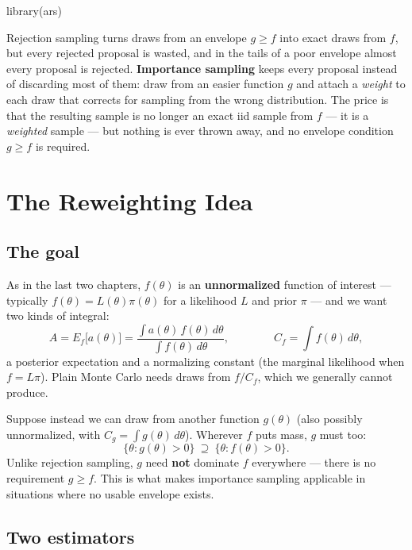 \documentclass[
  letterpaper,
  DIV=11,
  numbers=noendperiod]{scrreprt}
\newenvironment{Shaded}{\begin{snugshade}}{\end{snugshade}}
\newcommand{\FunctionTok}[1]{\textcolor[rgb]{0.28,0.35,0.67}{#1}}
\newcommand{\NormalTok}[1]{\textcolor[rgb]{0.00,0.23,0.31}{#1}}
\begin{document}
\begin{Shaded}
\begin{Highlighting}[]
\FunctionTok{library}\NormalTok{(ars)}
\end{Highlighting}
\end{Shaded}

Rejection sampling turns draws from an envelope \(g \ge f\) into exact
draws from \(f\), but every rejected proposal is wasted, and in the
tails of a poor envelope almost every proposal is rejected.
\textbf{Importance sampling} keeps every proposal instead of discarding
most of them: draw from an easier function \(g\) and attach a
\emph{weight} to each draw that corrects for sampling from the wrong
distribution. The price is that the resulting sample is no longer an
exact iid sample from \(f\) --- it is a \emph{weighted} sample --- but
nothing is ever thrown away, and no envelope condition \(g \ge f\) is
required.

\section{The Reweighting Idea}\label{the-reweighting-idea}

\subsection{The goal}\label{the-goal}

As in the last two chapters, \(f(\theta)\) is an \textbf{unnormalized}
function of interest --- typically \(f(\theta) = L(\theta)\pi(\theta)\)
for a likelihood \(L\) and prior \(\pi\) --- and we want two kinds of
integral: \[
A = E_f\big[a(\theta)\big] = \frac{\int a(\theta)\,f(\theta)\,d\theta}{\int f(\theta)\,d\theta},
\qquad\qquad
C_f = \int f(\theta)\,d\theta,
\] a posterior expectation and a normalizing constant (the marginal
likelihood when \(f = L\pi\)). Plain Monte Carlo needs draws from
\(f/C_f\), which we generally cannot produce.

Suppose instead we can draw from another function \(g(\theta)\) (also
possibly unnormalized, with \(C_g = \int g(\theta)\,d\theta\)). Wherever
\(f\) puts mass, \(g\) must too: \[
\{\theta : g(\theta) > 0\} \ \supseteq\ \{\theta : f(\theta) > 0\}.
\] Unlike rejection sampling, \(g\) need \textbf{not} dominate \(f\)
everywhere --- there is no requirement \(g \ge f\). This is what makes
importance sampling applicable in situations where no usable envelope
exists.

\subsection{Two estimators}\label{two-estimators}
\end{document}
